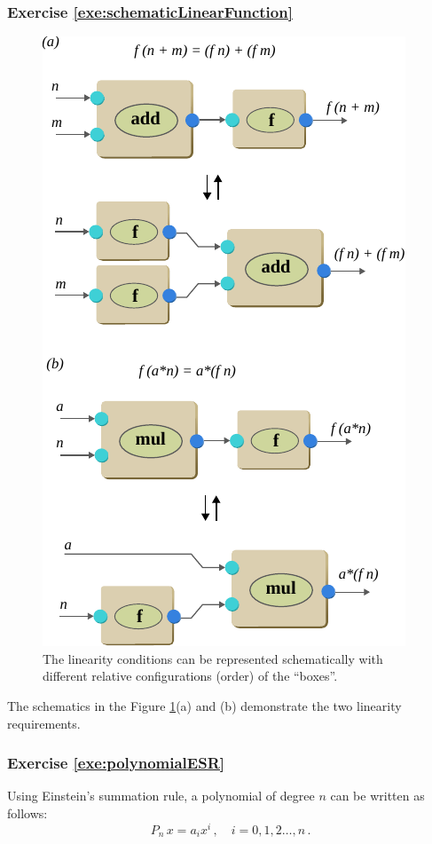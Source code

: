 \subsubsection*{Exercise \ref{exe:schematicLinearFunction}}
\begin{figure}[htbp]
  \centering
  \includegraphics[scale=1.0]{schematicLinearFunction}
  \caption{The linearity conditions can be represented schematically
    with different relative configurations (order) of the ``boxes''.}
  \label{fig:schematicLinearFunction}
\end{figure}
The schematics in the Figure \ref{fig:schematicLinearFunction}(a) and
(b) demonstrate the two linearity requirements.

\subsubsection*{Exercise \ref{exe:polynomialESR}}
Using Einstein's summation
rule, a polynomial of degree $n$ can be written  as follows:
\[
P_n\, x = a_i x^i\,,\quad i=0,1,2\ldots,n\,.
\]


